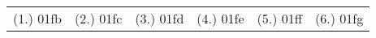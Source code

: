 \begin{eocexercises}{}



\par \practiceinfo
\par \begin{tabular}[h]{cccccc}
(1.)	01fb	&
(2.)	01fc	&
(3.)	01fd	&
(4.)	01fe	&
(5.)	01ff	&
(6.)	01fg	\\ %
\end{tabular}
\end{eocexercises}

